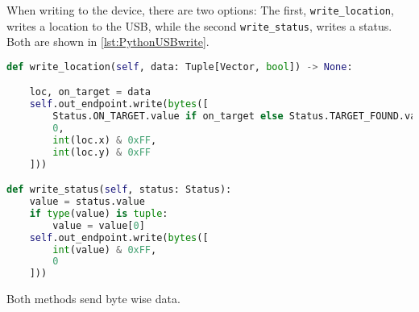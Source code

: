 When writing to the device, there are two options:
The first, \texttt{write\_location}, writes a location to the USB, while the second \texttt{write\_status}, writes a status.
Both are shown in \autoref{lst:PythonUSBwrite}.

\begin{lstlisting}[language=Python,label={lst:PythonUSBwrite},caption={Writing from the USB port connected to the NXT}]
def write_location(self, data: Tuple[Vector, bool]) -> None:

    loc, on_target = data
    self.out_endpoint.write(bytes([
	    Status.ON_TARGET.value if on_target else Status.TARGET_FOUND.value,
        0,
        int(loc.x) & 0xFF,
        int(loc.y) & 0xFF
    ]))

def write_status(self, status: Status):
    value = status.value
    if type(value) is tuple:
        value = value[0]
    self.out_endpoint.write(bytes([
        int(value) & 0xFF,
        0
    ]))
\end{lstlisting}
Both methods send byte wise data.